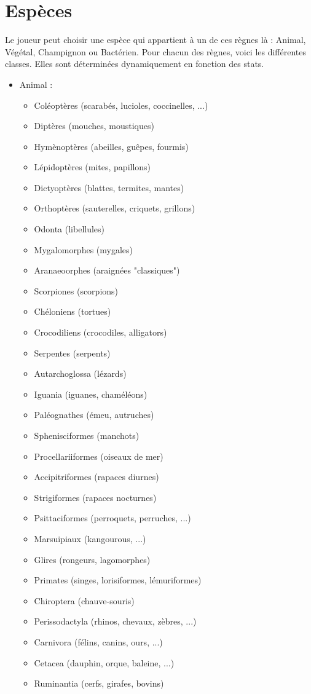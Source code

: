 \section{Espèces}
Le joueur peut choisir une espèce qui appartient à un de ces règnes là : Animal, Végétal, Champignon ou Bactérien. Pour chacun des règnes, voici les différentes classes. Elles sont déterminées dynamiquement en fonction des stats.
\begin{itemize}
	\item Animal :\begin{itemize}
				\item Coléoptères (scarabés, lucioles, coccinelles, ...)
				\item Diptères (mouches, moustiques)
				\item Hymènoptères (abeilles, guêpes, fourmis)
				\item Lépidoptères (mites, papillons)
				\item Dictyoptères (blattes, termites, mantes)
				\item Orthoptères (sauterelles, criquets, grillons)
				\item Odonta (libellules)
				
				\item Mygalomorphes (mygales)
				\item Aranaeoorphes (araignées "classiques")
				\item Scorpiones (scorpions)
				
				\item Chéloniens (tortues)
				\item Crocodiliens (crocodiles, alligators)
				\item Serpentes (serpents)
				\item Autarchoglossa (lézards)
				\item Iguania (iguanes, chaméléons)
				
				\item Paléognathes (émeu, autruches)
				\item Sphenisciformes (manchots)
				\item Procellariiformes (oiseaux de mer)
				\item Accipitriformes (rapaces diurnes)
				\item Strigiformes (rapaces nocturnes)
				\item Psittaciformes (perroquets, perruches, ...)
				
				\item Marsuipiaux (kangourous, ...)
				\item Glires (rongeurs, lagomorphes)
				\item Primates (singes, lorisiformes, lémuriformes)
				\item Chiroptera (chauve-souris)
				\item Perissodactyla (rhinos, chevaux, zèbres, ...)
				\item Carnivora (félins, canins, ours, ...)
				\item Cetacea (dauphin, orque, baleine, ...)
				\item Ruminantia (cerfs, girafes, bovins)
				

\end{itemize}
\end{itemize}
